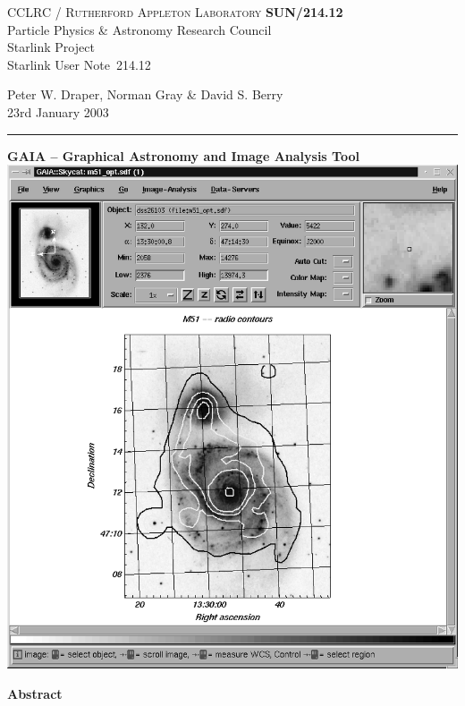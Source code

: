 \documentclass[twoside,11pt]{article}
\newcommand{\stardoccategory}  {Starlink User Note}
\newcommand{\stardocinitials}  {SUN}
\newcommand{\stardocnumber}    {214.12}
\newcommand{\stardocauthors}   {Peter W. Draper, Norman Gray \& David S. Berry}
\newcommand{\stardocdate}      {23rd January 2003}
\newcommand{\stardoctitle}     {GAIA -- Graphical Astronomy and
                                Image Analysis Tool}
\newcommand{\stardocname}{\stardocinitials /\stardocnumber}
\newenvironment{latexonly}{}{}
\renewcommand{\_}{\texttt{\symbol{95}}}
\begin{document}
\thispagestyle{empty}

\begin{latexonly}
   CCLRC / \textsc{Rutherford Appleton Laboratory} \hfill \textbf{\stardocname}\\
   {\large Particle Physics \& Astronomy Research Council}\\
   {\large Starlink Project\\}
   {\large \stardoccategory\ \stardocnumber}
   \begin{flushright}
   \stardocauthors\\
   \stardocdate
   \end{flushright}
   \vspace{-4mm}
   \rule{\textwidth}{0.5mm}
   \vspace{5mm}
   \begin{center}
   {\Large\textbf{\stardoctitle \\ [2.5ex]}}
   \vspace{5mm}
   \includegraphics[totalheight=5in]{sun214fig.ps}
   \end{center}

   \begin{center}
      {\Large\textbf{Abstract}}
   \end{center}
\end{latexonly}
\end{document}
